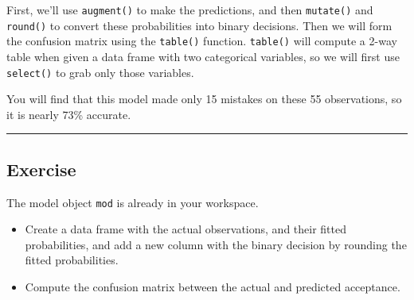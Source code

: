 \documentclass[
]{book}
\newenvironment{Shaded}{\begin{snugshade}}{\end{snugshade}}
\newcommand{\CommentTok}[1]{\textcolor[rgb]{0.56,0.35,0.01}{\textit{#1}}}
\newcommand{\DataTypeTok}[1]{\textcolor[rgb]{0.13,0.29,0.53}{#1}}
\newcommand{\KeywordTok}[1]{\textcolor[rgb]{0.13,0.29,0.53}{\textbf{#1}}}
\newcommand{\NormalTok}[1]{#1}
\newcommand{\OperatorTok}[1]{\textcolor[rgb]{0.81,0.36,0.00}{\textbf{#1}}}
\newcommand{\StringTok}[1]{\textcolor[rgb]{0.31,0.60,0.02}{#1}}
\providecommand{\tightlist}{%
  \setlength{\itemsep}{0pt}\setlength{\parskip}{0pt}}
\begin{document}
First, we'll use \texttt{augment()} to make the predictions, and then \texttt{mutate()} and \texttt{round()} to convert these probabilities into binary decisions. Then we will form the confusion matrix using the \texttt{table()} function. \texttt{table()} will compute a 2-way table when given a data frame with two categorical variables, so we will first use \texttt{select()} to grab only those variables.

You will find that this model made only 15 mistakes on these 55 observations, so it is nearly 73\% accurate.

\begin{center}\rule{0.5\linewidth}{0.5pt}\end{center}

\hypertarget{exercise-20}{%
\subsection*{Exercise}\label{exercise-20}}

The model object \texttt{mod} is already in your workspace.

\begin{itemize}
\tightlist
\item
  Create a data frame with the actual observations, and their fitted probabilities, and add a new column with the binary decision by rounding the fitted probabilities.
\end{itemize}

\begin{Shaded}
\end{Shaded}

\begin{itemize}
\tightlist
\item
  Compute the confusion matrix between the actual and predicted acceptance.
\end{itemize}

\begin{Shaded}
\end{Shaded}
\end{document}

